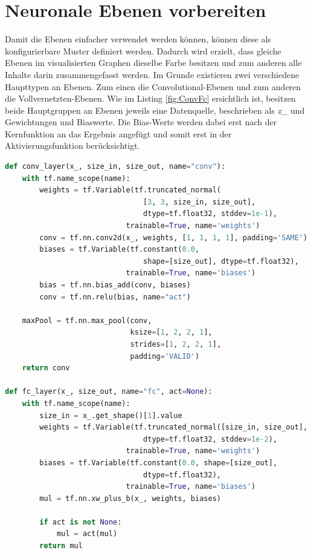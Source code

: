 \section{Neuronale Ebenen vorbereiten}

Damit die Ebenen einfacher verwendet werden können, können diese als konfigurierbare Muster definiert werden. 
Dadurch wird erzielt, dass gleiche Ebenen im visualisierten Graphen dieselbe Farbe besitzen und zum anderen alle Inhalte darin zusammengefasst werden. 
Im Grunde existieren zwei verschiedene Haupttypen an Ebenen. 
Zum einen die Convolutional-Ebenen und zum anderen die Vollvernetzten-Ebenen. 
Wie im Listing \ref{fig:ConvFc} ersichtlich ist, besitzen beide Hauptgruppen an Ebenen jeweils eine Datenquelle, beschrieben als \textit{x\_} und Gewichtungen und Biaswerte. 
Die Bias-Werte werden dabei erst nach der Kernfunktion an das Ergebnis angefügt und somit erst in der Aktivierungsfunktion berücksichtigt. 
\begin{lstlisting}[caption={Definition der Convolutional- und Vollvernetzten-Ebenen},label=fig:ConvFc,captionpos=b,language=Python]
def conv_layer(x_, size_in, size_out, name="conv"):
    with tf.name_scope(name):
        weights = tf.Variable(tf.truncated_normal(
        						[3, 3, size_in, size_out], 
        						dtype=tf.float32, stddev=1e-1), 
							trainable=True, name='weights')
        conv = tf.nn.conv2d(x_, weights, [1, 1, 1, 1], padding='SAME')
        biases = tf.Variable(tf.constant(0.0, 
								shape=[size_out], dtype=tf.float32), 
                            trainable=True, name='biases')
        bias = tf.nn.bias_add(conv, biases)
        conv = tf.nn.relu(bias, name="act")

    maxPool = tf.nn.max_pool(conv, 
                             ksize=[1, 2, 2, 1],
                             strides=[1, 2, 2, 1],
                             padding='VALID')
    return conv

def fc_layer(x_, size_out, name="fc", act=None):
    with tf.name_scope(name):
        size_in = x_.get_shape()[1].value
        weights = tf.Variable(tf.truncated_normal([size_in, size_out], 
								dtype=tf.float32, stddev=1e-2), 
							trainable=True, name='weights')
        biases = tf.Variable(tf.constant(0.0, shape=[size_out], 
								dtype=tf.float32), 
							trainable=True, name='biases')
        mul = tf.nn.xw_plus_b(x_, weights, biases)
        
        if act is not None:
            mul = act(mul)
        return mul
\end{lstlisting}

